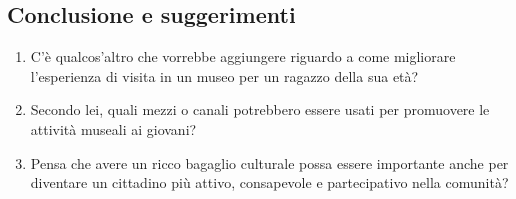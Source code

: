 \documentclass[a4paper, 12pt]{article}
\begin{document}
\subsection{\textcolor{subsectioncolor}{Conclusione e suggerimenti}}

\begin{enumerate}
    \item C’è qualcos'altro che vorrebbe aggiungere riguardo a come migliorare l'esperienza di visita in un museo per un ragazzo della sua età?
    \item Secondo lei, quali mezzi o canali potrebbero essere usati per promuovere le attività museali ai giovani?
    \item Pensa che avere un ricco bagaglio culturale possa essere importante anche per diventare un cittadino più attivo, consapevole e partecipativo nella comunità?
\end{enumerate}
\end{document}
